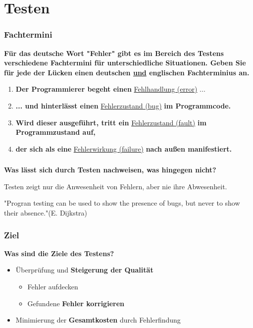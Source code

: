 \part{Testen}
\section{Fachtermini}
\textbf{Für das deutsche Wort "Fehler" gibt es im Bereich des Testens verschiedene Fachtermini für unterschiedliche Situationen. Geben Sie für jede der Lücken einen deutschen \underline{und} englischen Fachterminius an.}
\begin{enumerate}
    \item \textbf{Der Programmierer begeht einen} \underline{Fehlhandlung (error)} ...
    \item \textbf{... und hinterlässt einen} \underline{Fehlerzustand (bug)} \textbf{im Programmcode.}
    \item \textbf{Wird dieser ausgeführt, tritt ein} \underline{Fehlerzustand (fault)} \textbf{im Programmzustand auf,}
    \item \textbf{der sich als eine} \underline{Fehlerwirkung (failure)} \textbf{nach au\ss en manifestiert.}
\end{enumerate}

\section{}
\textbf{Was lässt sich durch Testen nachweisen, was hingegen nicht?}

Testen zeigt nur die Anwesenheit von Fehlern, aber nie ihre Abwesenheit.

"Progran testing can be used to show the presence of bugs, but never to show their absence."(E. Dijkstra)
\section{Ziel}
\textbf{Was sind die Ziele des Testens?}
\begin{itemize}
    \item Überprüfung und \textbf{Steigerung der Qualität}\begin{itemize}
              \item Fehler aufdecken
              \item Gefundene \textbf{Fehler korrigieren}
          \end{itemize}
    \item Minimierung der \textbf{Gesamtkosten} durch Fehlerfindung
\end{itemize}

